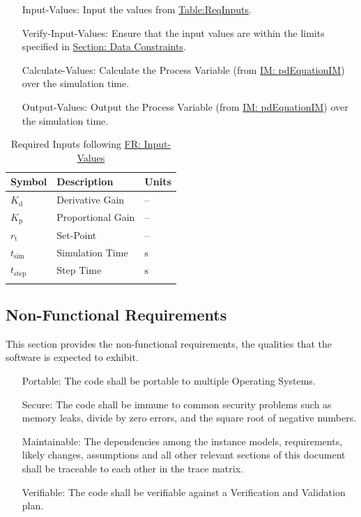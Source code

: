 \documentclass[12pt]{article}
\begin{document}
\begin{itemize}
\item[Input-Values:\phantomsection\label{inputValues}]{Input the values from \hyperref[Table:ReqInputs]{Table:ReqInputs}.}
\item[Verify-Input-Values:\phantomsection\label{verifyInputs}]{Ensure that the input values are within the limits specified in \hyperref[Sec:DataConstraints]{Section: Data Constraints}.}
\item[Calculate-Values:\phantomsection\label{calculateValues}]{Calculate the Process Variable (from \hyperref[IM:pdEquationIM]{IM: pdEquationIM}) over the simulation time.}
\item[Output-Values:\phantomsection\label{outputValues}]{Output the Process Variable (from \hyperref[IM:pdEquationIM]{IM: pdEquationIM}) over the simulation time.}
\end{itemize}
\begin{longtable}{l l l}
\toprule
\textbf{Symbol} & \textbf{Description} & \textbf{Units}
\\
\midrule
\endhead
${K_{\text{d}}}$ & Derivative Gain & --
\\
${K_{\text{p}}}$ & Proportional Gain & --
\\
${r_{\text{t}}}$ & Set-Point & --
\\
${t_{\text{sim}}}$ & Simulation Time & ${\text{s}}$
\\
${t_{\text{step}}}$ & Step Time & ${\text{s}}$
\\
\bottomrule
\caption{Required Inputs following \hyperref[inputValues]{FR: Input-Values}}
\label{Table:ReqInputs}
\end{longtable}
\subsection{Non-Functional Requirements}
\label{Sec:NFRs}
This section provides the non-functional requirements, the qualities that the software is expected to exhibit.

\begin{itemize}
\item[Portable:\phantomsection\label{portability}]{The code shall be portable to multiple Operating Systems.}
\item[Secure:\phantomsection\label{security}]{The code shall be immune to common security problems such as memory leaks, divide by zero errors, and the square root of negative numbers.}
\item[Maintainable:\phantomsection\label{maintainability}]{The dependencies among the instance models, requirements, likely changes, assumptions and all other relevant sections of this document shall be traceable to each other in the trace matrix.}
\item[Verifiable:\phantomsection\label{verifiability}]{The code shall be verifiable against a Verification and Validation plan.}
\end{itemize}
\end{document}
